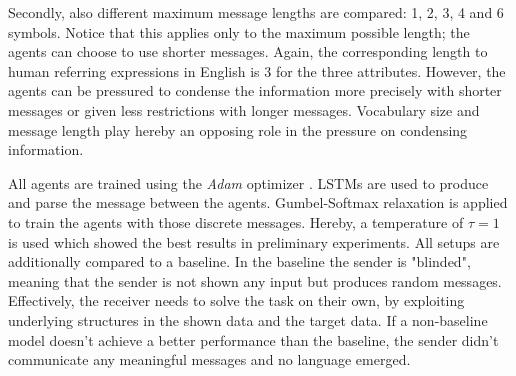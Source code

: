 Secondly, also different maximum message lengths are compared: 1, 2, 3, 4 and 6 symbols.
Notice that this applies only to the maximum possible length; the agents can choose to use shorter messages.
Again, the corresponding length to human referring expressions in English is 3 for the three attributes.
However, the agents can be pressured to condense the information more precisely with shorter messages or given less restrictions with longer messages.
Vocabulary size and message length play hereby an opposing role in the pressure on condensing information.

All agents are trained using the \emph{Adam} optimizer \citep{Kingma2015}.
LSTMs are used to produce and parse the message between the agents.
Gumbel-Softmax relaxation is applied to train the agents with those discrete messages.
Hereby, a temperature of $\tau=1$ is used which showed the best results in preliminary experiments.
All setups are additionally compared to a baseline.
In the baseline the sender is "blinded", meaning that the sender is not shown any input but produces random messages.
Effectively, the receiver needs to solve the task on their own, by exploiting underlying structures in the shown data and the target data.
If a non-baseline model doesn't achieve a better performance than the baseline, the sender didn't communicate any meaningful messages and no language emerged.